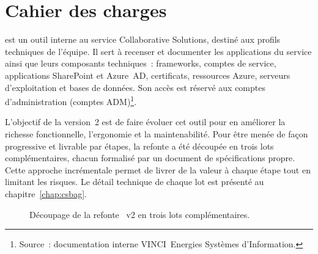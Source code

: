 \section{Cahier des charges}
\label{sec:cahier-charges}
\csbag est un outil interne au service Collaborative Solutions, destiné aux
profils techniques de l'équipe. Il sert à recenser et documenter les
applications du service ainsi que leurs composants techniques~: frameworks,
comptes de service, applications SharePoint et Azure~AD, certificats,
ressources Azure, serveurs d'exploitation et bases de données. Son accès est
réservé aux comptes d'administration (comptes ADM)\footnote{Source~:
documentation interne VINCI~Energies Systèmes d'Information.}.

L'objectif de la version~2 est de faire évoluer cet outil pour en améliorer la
richesse fonctionnelle, l'ergonomie et la maintenabilité. Pour être menée de
façon progressive et livrable par étapes, la refonte a été découpée en trois
lots complémentaires, chacun formalisé par un document de spécifications
propre. Cette approche incrémentale permet de livrer de la valeur à chaque
étape tout en limitant les risques. Le détail technique de chaque lot est
présenté au chapitre~\ref{chap:csbag}.

\begin{figure}[H]
  \centering
  \caption{Découpage de la refonte \csbag~v2 en trois lots complémentaires.}
  \label{fig:lots}
\end{figure}

